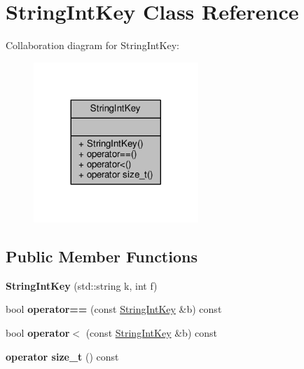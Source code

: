 \hypertarget{classStringIntKey}{}\section{String\+Int\+Key Class Reference}
\label{classStringIntKey}


Collaboration diagram for String\+Int\+Key\+:
\nopagebreak
\begin{figure}[H]
\begin{center}
\leavevmode
\includegraphics[width=176pt]{dc/d85/classStringIntKey__coll__graph}
\end{center}
\end{figure}
\subsection*{Public Member Functions}
\begin{DoxyCompactItemize}
\item 
{\bfseries String\+Int\+Key} (std\+::string k, int f)\hypertarget{classStringIntKey_accee0ed35f823e1f9751d5327ec4ce8b}{}\label{classStringIntKey_accee0ed35f823e1f9751d5327ec4ce8b}

\item 
bool {\bfseries operator==} (const \hyperlink{classStringIntKey}{String\+Int\+Key} \&b) const \hypertarget{classStringIntKey_a953324076c72cfe04a697c0d2b061d08}{}\label{classStringIntKey_a953324076c72cfe04a697c0d2b061d08}

\item 
bool {\bfseries operator$<$} (const \hyperlink{classStringIntKey}{String\+Int\+Key} \&b) const \hypertarget{classStringIntKey_a0391a0c3ae23614bb2ae669fa90c4e10}{}\label{classStringIntKey_a0391a0c3ae23614bb2ae669fa90c4e10}

\item 
{\bfseries operator size\+\_\+t} () const \hypertarget{classStringIntKey_a79cb046fad3d9115dcc949a3d87ca937}{}\label{classStringIntKey_a79cb046fad3d9115dcc949a3d87ca937}

\end{DoxyCompactItemize}
